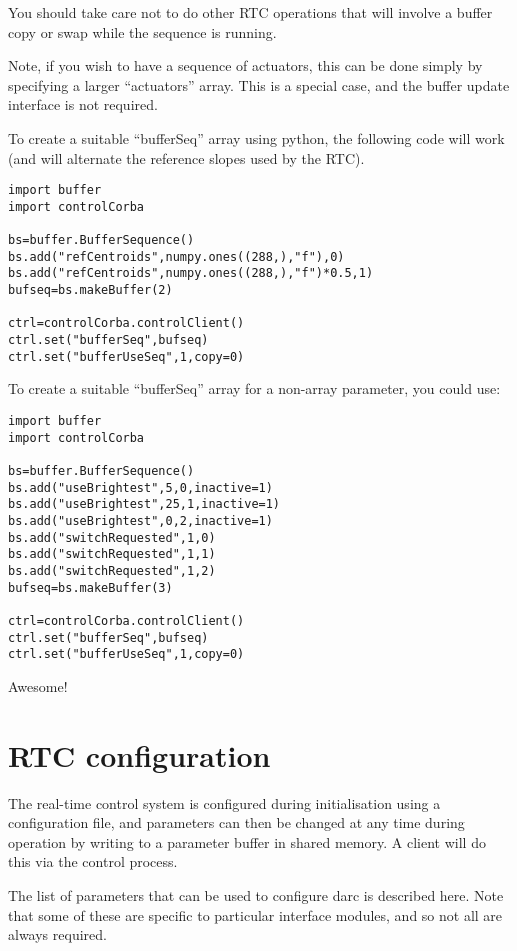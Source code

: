 \documentclass[a4,10pt]{article}
\begin{document}
You should take care not to do other RTC operations that will involve
a buffer copy or swap while the sequence is running.

Note, if you wish to have a sequence of actuators, this can be done
simply by specifying a larger ``actuators'' array.  This is a special
case, and the buffer update interface is not required.

To create a suitable ``bufferSeq'' array using python, the following
code will work (and will alternate the reference slopes used by the RTC).

\begin{verbatim}
import buffer
import controlCorba

bs=buffer.BufferSequence()
bs.add("refCentroids",numpy.ones((288,),"f"),0)
bs.add("refCentroids",numpy.ones((288,),"f")*0.5,1)
bufseq=bs.makeBuffer(2)

ctrl=controlCorba.controlClient()
ctrl.set("bufferSeq",bufseq)
ctrl.set("bufferUseSeq",1,copy=0)
\end{verbatim}

To create a suitable ``bufferSeq'' array for a non-array parameter,
you could use:
\begin{verbatim}
import buffer
import controlCorba

bs=buffer.BufferSequence()
bs.add("useBrightest",5,0,inactive=1)
bs.add("useBrightest",25,1,inactive=1)
bs.add("useBrightest",0,2,inactive=1)
bs.add("switchRequested",1,0)
bs.add("switchRequested",1,1)
bs.add("switchRequested",1,2)
bufseq=bs.makeBuffer(3)

ctrl=controlCorba.controlClient()
ctrl.set("bufferSeq",bufseq)
ctrl.set("bufferUseSeq",1,copy=0)
\end{verbatim}

Awesome!




\section{RTC configuration}
The real-time control system is configured during initialisation using
a configuration file, and parameters can then be changed at
any time during operation by writing to a parameter buffer in shared
memory.  A client will do this via the control process.

The list of parameters that can be used to configure darc is described
here.  Note that some of these are specific to particular interface
modules, and so not all are always required.
\end{document}
